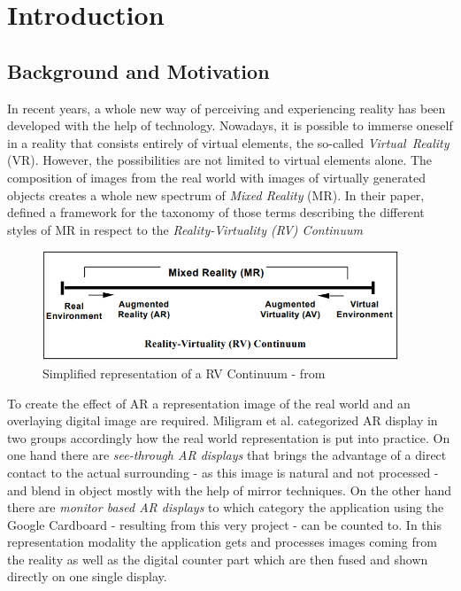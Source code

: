 \chapter{Introduction}
\label{chp:introduction}

\section{Background and Motivation}

In recent years, a whole new way of perceiving and experiencing reality has been developed with the help of technology. Nowadays, it is possible to immerse oneself in a reality that consists entirely of virtual elements, the so-called \mbox{\textit{Virtual Reality}} (VR). However, the possibilities are not limited to virtual elements alone. The composition of images from the real world with images of virtually generated objects creates a whole new spectrum of \textit{Mixed Reality} (MR). In their paper, \cite{Milgram1994AugmentedContinuum} defined a framework for the taxonomy of those terms describing the different styles of MR in respect to the \textit{Reality-Virtuality (RV) Continuum}

\begin{figure}[h]
    \centering
    \includegraphics[width=0.95\textwidth]{Document/Figures/chapter1/RealityVirtualityContinuum.png}
    \caption[Simplified representation of a RV Continuum]{Simplified representation of a RV Continuum - from \cite{Milgram1994AugmentedContinuum}}
\end{figure}

To create the effect of AR a representation image of the real world and an overlaying digital image are required. Miligram et al. categorized AR display in two groups accordingly how the real world representation is put into practice. On one hand there are \textit{see-through AR displays} that brings the advantage of a direct contact to the actual surrounding - as this image is natural and not processed - and blend in object mostly with the help of mirror techniques. On the other hand there are \textit{monitor based AR displays} to which category the application using the Google Cardboard - resulting from this very project - can be counted to. In this representation modality the application gets and processes images coming from the reality as well as the digital counter part which are then fused and shown directly on one single display.

